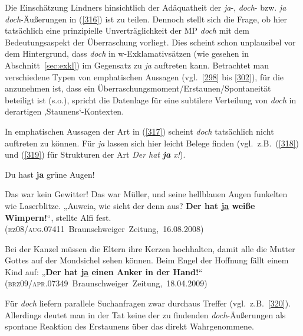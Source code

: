 Die Einschätzung Lindners hinsichtlich der Adäquatheit der \textit{ja}-, \textit{doch}- bzw. \textit{ja doch}-Äußerungen in (\ref{316}) ist zu teilen. Dennoch stellt sich die Frage, ob hier tatsächlich eine prinzipielle Unverträglichkeit der MP \textit{doch} mit dem Bedeutungsaspekt der Überraschung vorliegt. Dies scheint schon unplausibel vor dem Hintergrund, dass \textit{doch} in w-Exklamativsätzen (wie gesehen in Abschnitt~\ref{sec:exkl}) im Gegensatz zu \textit{ja} auftreten kann. Betrachtet man verschiedene Typen von emphatischen Aussagen (vgl.\ \ref{298} bis \ref{302}), für die anzunehmen ist, dass ein Überraschungsmoment/Erstaunen/Spontaneität beteiligt ist (s.o.), spricht die Datenlage für eine subtilere Verteilung von \textit{doch} in derartigen ‚Staunens‘-Kontexten.  

In emphatischen Aussagen der Art in (\ref{317}) scheint \textit{doch} tatsächlich nicht auftre\-ten zu können. Für \textit{ja} lassen sich hier leicht Belege finden (vgl.\ z.B.\ (\ref{318}) und (\ref{319}) für Strukturen der Art \textit{Der hat \textbf{ja} x!}). 

\begin{exe}
	\ex\label{317}
	Du hast \textbf{ja} grüne Augen! 
	\hfill\hbox{\citet[108]{Thurmair1989}}
\end{exe}

\begin{exe}
	\ex\label{318}
 
	Das war kein Gewitter! Das war Müller, und seine hellblauen Augen funkelten wie Laserblitze.
	„Auweia, wie sieht der denn aus? \textbf{Der hat \underline{ja} weiße Wimpern!}“, stellte Alfi fest.
	\newline
	\hbox{}\hfill\hbox{(\textsc{rz08/aug.07411} Braunschweiger Zeitung, 16.08.2008)}	
\end{exe}

\begin{exe}
	\ex\label{319}
 
	Bei der Kanzel müssen die Eltern ihre Kerzen hochhalten, damit alle die Mutter Gottes auf der Mondsichel sehen können. Beim Engel der Hoffnung fällt 		einem Kind auf: „\textbf{Der hat \underline{ja} einen Anker in der Hand!}“\\      
	\hbox{}\hfill\hbox{(\textsc{brz09/apr.07349} Braunschweiger Zeitung, 18.04.2009)}	
\end{exe}							                                      							      
Für \textit{doch} liefern parallele Suchanfragen zwar durchaus Treffer (vgl.\ z.B.\ \ref{320}). Allerdings deutet man in der Tat keine der zu findenden \textit{doch}-Äußerungen als spontane Reaktion des Erstaunens über das direkt Wahrgenommene.


